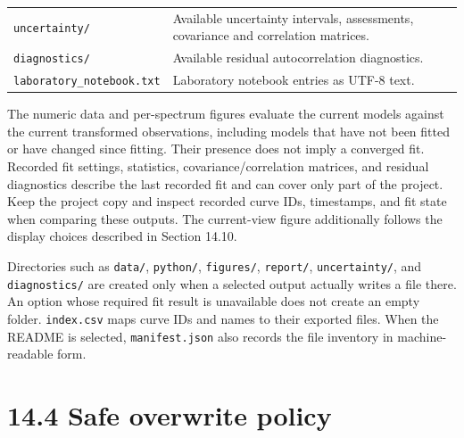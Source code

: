 \documentclass[
  10pt,
  a4paper,
  oneside]{scrreprt}
\begin{document}
\begin{longtable}[]{@{}ll@{}}
\begin{minipage}[t]{0.47\columnwidth}\raggedright
\texttt{uncertainty/}\strut
\end{minipage} & \begin{minipage}[t]{0.47\columnwidth}\raggedright
Available uncertainty intervals, assessments, covariance and correlation
matrices.\strut
\end{minipage}\tabularnewline
\begin{minipage}[t]{0.47\columnwidth}\raggedright
\texttt{diagnostics/}\strut
\end{minipage} & \begin{minipage}[t]{0.47\columnwidth}\raggedright
Available residual autocorrelation diagnostics.\strut
\end{minipage}\tabularnewline
\begin{minipage}[t]{0.47\columnwidth}\raggedright
\texttt{laboratory\_notebook.txt}\strut
\end{minipage} & \begin{minipage}[t]{0.47\columnwidth}\raggedright
Laboratory notebook entries as UTF-8 text.\strut
\end{minipage}\tabularnewline
\bottomrule
\end{longtable}

The numeric data and per-spectrum figures evaluate the current models
against the current transformed observations, including models that have
not been fitted or have changed since fitting. Their presence does not
imply a converged fit. Recorded fit settings, statistics,
covariance/correlation matrices, and residual diagnostics describe the
last recorded fit and can cover only part of the project. Keep the
project copy and inspect recorded curve IDs, timestamps, and fit state
when comparing these outputs. The current-view figure additionally
follows the display choices described in Section 14.10.

Directories such as \texttt{data/}, \texttt{python/}, \texttt{figures/},
\texttt{report/}, \texttt{uncertainty/}, and \texttt{diagnostics/} are
created only when a selected output actually writes a file there. An
option whose required fit result is unavailable does not create an empty
folder. \texttt{index.csv} maps curve IDs and names to their exported
files. When the README is selected, \texttt{manifest.json} also records
the file inventory in machine-readable form.

\hypertarget{safe-overwrite-policy}{%
\section{14.4 Safe overwrite policy}\label{safe-overwrite-policy}}
\end{document}
